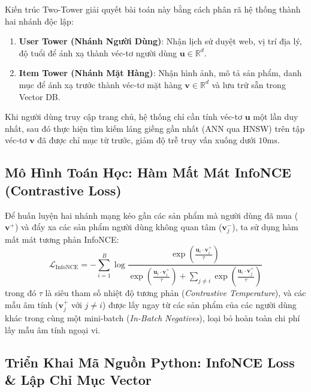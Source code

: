 Kiến trúc Two-Tower giải quyết bài toán này bằng cách phân rã hệ thống thành hai nhánh độc lập:
\begin{enumerate}
  \item \textbf{User Tower (Nhánh Người Dùng)}: Nhận lịch sử duyệt web, vị trí địa lý, độ tuổi để ánh xạ thành véc-tơ người dùng $\mathbf{u} \in \mathbb{R}^d$.
  \item \textbf{Item Tower (Nhánh Mặt Hàng)}: Nhận hình ảnh, mô tả sản phẩm, danh mục để ánh xạ trước thành véc-tơ mặt hàng $\mathbf{v} \in \mathbb{R}^d$ và lưu trữ sẵn trong Vector DB.
\end{enumerate}
Khi người dùng truy cập trang chủ, hệ thống chỉ cần tính véc-tơ $\mathbf{u}$ một lần duy nhất, sau đó thực hiện tìm kiếm láng giềng gần nhất (ANN qua HNSW) trên tập véc-tơ $\mathbf{v}$ đã được chỉ mục từ trước, giảm độ trễ truy vấn xuống dưới $10\text{ms}$.

\subsection{Mô Hình Toán Học: Hàm Mất Mát InfoNCE (Contrastive Loss)}
Để huấn luyện hai nhánh mạng kéo gần các sản phẩm mà người dùng đã mua ($\mathbf{v}^+$) và đẩy xa các sản phẩm người dùng không quan tâm ($\mathbf{v}_j^-$), ta sử dụng hàm mất mát tương phản InfoNCE:
\begin{equation}
\mathcal{L}_{\text{InfoNCE}} = - \sum_{i=1}^B \log \frac{\exp\left(\frac{\mathbf{u}_i \cdot \mathbf{v}_i^+}{\tau}\right)}{\exp\left(\frac{\mathbf{u}_i \cdot \mathbf{v}_i^+}{\tau}\right) + \sum_{j \neq i} \exp\left(\frac{\mathbf{u}_i \cdot \mathbf{v}_j^+}{\tau}\right)}
\end{equation}
trong đó $\tau$ là siêu tham số nhiệt độ tương phản (\textit{Contrastive Temperature}), và các mẫu âm tính ($\mathbf{v}_j^+$ với $j \neq i$) được lấy ngay từ các sản phẩm của các người dùng khác trong cùng một mini-batch (\textit{In-Batch Negatives}), loại bỏ hoàn toàn chi phí lấy mẫu âm tính ngoại vi.

\subsection{Triển Khai Mã Nguồn Python: InfoNCE Loss \& Lập Chỉ Mục Vector}

